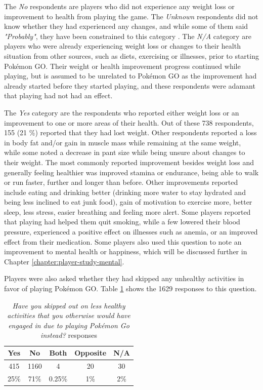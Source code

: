 The \emph{No} respondents are players who did not experience any weight loss or improvement to health from playing the game. The \emph{Unknown} respondents did not know whether they had experienced any changes, and while some of them said \emph{"Probably"}, they have been constrained to this category . The \emph{N/A} category are players who were already experiencing weight loss or changes to their health situation from other sources, such as diets, exercising or illnesses, prior to starting Pokémon GO. Their weight or health improvement progress continued while playing, but is assumed to be unrelated to Pokémon GO as the improvement had already started before they started playing, and these respondents were adamant that playing had not had an effect.

The \emph{Yes} category are the respondents who reported either weight loss or an improvement to one or more areas of their health. Out of these 738 respondents, 155 (21 \%) reported that they had lost weight. Other respondents reported a loss in body fat and/or gain in muscle mass while remaining at the same weight, while some noted a decrease in pant size while being unsure about changes to their weight. The most commonly reported improvement besides weight loss and generally feeling healthier was improved stamina or endurance, being able to walk or run faster, further and longer than before. Other improvements reported include eating and drinking better (drinking more water to stay hydrated and being less inclined to eat junk food), gain of motivation to exercise more, better sleep, less stress, easier breathing and feeling more alert. Some players reported that playing had helped them quit smoking, while a few lowered their blood pressure, experienced a positive effect on illnesses such as anemia, or an improved effect from their medication. Some players also used this question to note an improvement to mental health or happiness, which will be discussed further in Chapter \ref{chapter:player-study-mental}.

Players were also asked whether they had skipped any unhealthy activities in favor of playing Pokémon GO. Table \ref{tbl:skipping-unhealthy-activities} shows the 1629 responses to this question.

\begin{table}[h]
	\centering
	\caption{\emph{Have you skipped out on less healthy activities that you otherwise would have engaged in due to playing Pokémon Go instead?} responses}
	\label{tbl:skipping-unhealthy-activities}
	\begin{tabular}{|c|c|c|c|c|}
		\hline
		\textbf{Yes} & \textbf{No} & \textbf{Both} & \textbf{Opposite} & \textbf{N/A}\\
		\hline\hline
		415		& 1160	& 4		& 20	& 30\\
		25\%	& 71\%	& 0.25\%& 1\%	& 2\%\\\hline
	\end{tabular}
\end{table}

